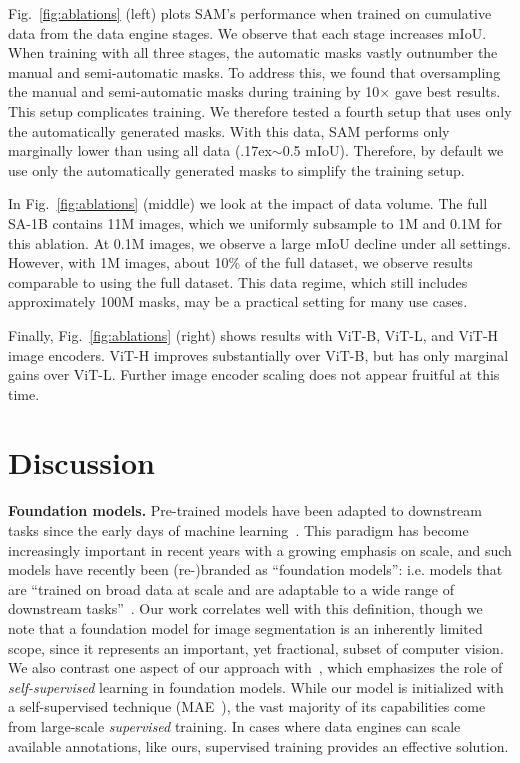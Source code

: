 Fig.~\ref{fig:ablations} (left) plots SAM's performance when trained on cumulative data from the data engine stages. We observe that each stage increases mIoU. When training with all three stages, the automatic masks vastly outnumber the manual and semi-automatic masks. To address this, we found that oversampling the manual and semi-automatic masks during training by 10${\times}$ gave best results. This setup complicates training. We therefore tested a fourth setup that uses only the automatically generated masks. With this data, SAM performs only marginally lower than using all data (\raise.17ex\hbox{$\scriptstyle\sim$}0.5 mIoU). Therefore, by default we use only the automatically generated masks to simplify the training setup.

In Fig.~\ref{fig:ablations} (middle) we look at the impact of data volume. The full \mbox{SA-1B} contains 11M images, which we uniformly subsample to 1M and 0.1M for this ablation. At 0.1M images, we observe a large mIoU decline under all settings. However, with 1M images, about 10\% of the full dataset, we observe results comparable to using the full dataset. This data regime, which still includes approximately 100M masks, may be a practical setting for many use cases.

Finally, Fig.~\ref{fig:ablations} (right) shows results with ViT-B, ViT-L, and ViT-H image encoders. ViT-H improves substantially over ViT-B, but has only marginal gains over ViT-L. Further image encoder scaling does not appear fruitful at this time.

\section{Discussion}\label{sec:disc}

\textbf{Foundation models.} Pre-trained models have been adapted to downstream tasks since the early days of machine learning~\cite{thrun1995learning}. This paradigm has become increasingly important in recent years with a growing emphasis on scale, and such models have recently been (re-)branded as ``foundation models'': i.e. models that are ``trained on broad data at scale and are adaptable to a wide range of downstream tasks''~\cite{bommasani2021opportunities}. Our work correlates well with this definition, though we note that a foundation model for image segmentation is an inherently limited scope, since it represents an important, yet fractional, subset of computer vision. We also contrast one aspect of our approach with~\cite{bommasani2021opportunities}, which emphasizes the role of \emph{self-supervised} learning in foundation models. While our model is initialized with a self-supervised technique (MAE~\cite{he2022masked}), the vast majority of its capabilities come from large-scale \emph{supervised} training. In cases where data engines can scale available annotations, like ours, supervised training provides an effective solution.


